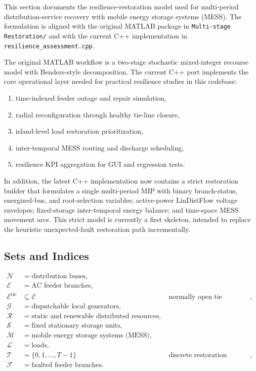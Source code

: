This section documents the resilience-restoration model used for
multi-period distribution-service recovery with mobile energy storage systems
(MESS). The formulation is aligned with the original MATLAB package in
\texttt{Multi-stage Restoration/} and with the current C++ implementation in
\texttt{resilience\_assessment.cpp}.

The original MATLAB workflow is a two-stage stochastic mixed-integer recourse
model with Benders-style decomposition. The current C++ port implements the
core operational layer needed for practical resilience studies in this codebase:
\begin{enumerate}
  \item time-indexed feeder outage and repair simulation,
  \item radial reconfiguration through healthy tie-line closure,
  \item island-level load restoration prioritization,
  \item inter-temporal MESS routing and discharge scheduling,
  \item resilience KPI aggregation for GUI and regression tests.
\end{enumerate}

In addition, the latest C++ implementation now contains a strict restoration
builder that formulates a single multi-period MIP with binary branch-status,
energized-bus, and root-selection variables; active-power LinDistFlow voltage
envelopes; fixed-storage inter-temporal energy balance; and time-space MESS
movement arcs. This strict model is currently a first skeleton, intended to
replace the heuristic unexpected-fault restoration path incrementally.

\subsection{Sets and Indices}

\begin{align}
\mathcal{N} &= \text{distribution buses}, \\
\mathcal{E} &= \text{AC feeder branches}, \\
\mathcal{E}^{\mathrm{tie}} &\subseteq \mathcal{E} && \text{normally open tie branches}, \\
\mathcal{G} &= \text{dispatchable local generators}, \\
\mathcal{R} &= \text{static and renewable distributed resources}, \\
\mathcal{S} &= \text{fixed stationary storage units}, \\
\mathcal{M} &= \text{mobile energy storage systems (MESS)}, \\
\mathcal{L} &= \text{loads}, \\
\mathcal{T} &= \{0,1,\dots,T-1\} && \text{discrete restoration periods}, \\
\mathcal{F} &= \text{faulted feeder branches}. 
\end{align}


